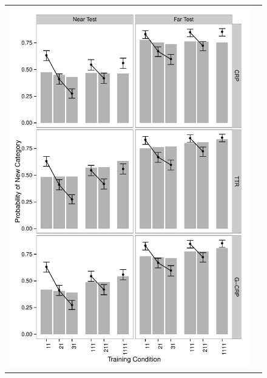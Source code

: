 \documentclass[doc]{apa6}
\begin{document}
\begin{figure}[t]
\begin{center}
\begin{tabular}{cc}
\includegraphics[scale=.5]{fit3_flat.pdf} &

\end{tabular}
\end{center}
\end{figure}
\end{document}
